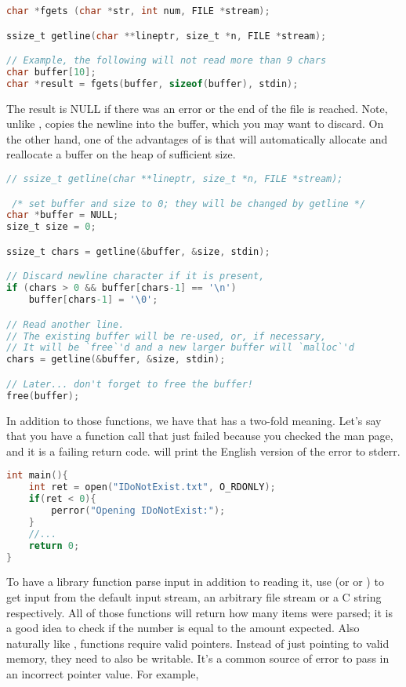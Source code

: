\begin{lstlisting}[language=C]
char *fgets (char *str, int num, FILE *stream);

ssize_t getline(char **lineptr, size_t *n, FILE *stream);

// Example, the following will not read more than 9 chars
char buffer[10];
char *result = fgets(buffer, sizeof(buffer), stdin);
\end{lstlisting}

The result is NULL if there was an error or the end of the file is reached.
Note, unlike ,  copies the newline into the buffer, which you may want to discard.
On the other hand, one of the advantages of  is that will automatically allocate and reallocate a buffer on the heap of sufficient size.

\begin{lstlisting}[language=C]
// ssize_t getline(char **lineptr, size_t *n, FILE *stream);

 /* set buffer and size to 0; they will be changed by getline */
char *buffer = NULL;
size_t size = 0;

ssize_t chars = getline(&buffer, &size, stdin);

// Discard newline character if it is present,
if (chars > 0 && buffer[chars-1] == '\n')
    buffer[chars-1] = '\0';

// Read another line.
// The existing buffer will be re-used, or, if necessary,
// It will be `free`'d and a new larger buffer will `malloc`'d
chars = getline(&buffer, &size, stdin);

// Later... don't forget to free the buffer!
free(buffer);
\end{lstlisting}

In addition to those functions, we have  that has a two-fold meaning.
Let's say that you have a function call that just failed because you checked the man page, and it is a failing return code.
 will print the English version of the error to stderr.

\begin{lstlisting}[language=C]
int main(){
    int ret = open("IDoNotExist.txt", O_RDONLY);
    if(ret < 0){
        perror("Opening IDoNotExist:");
    }
    //...
    return 0;
}
\end{lstlisting}

To have a library function parse input in addition to reading it, use  (or  or ) to get input from the default input stream, an arbitrary file stream or a C string respectively.
All of those functions will return how many items were parsed; it is a good idea to check if the number is equal to the amount expected.
Also naturally like ,  functions require valid pointers. Instead of just pointing to valid memory, they need to also be writable.
It's a common source of error to pass in an incorrect pointer value.
For example,

